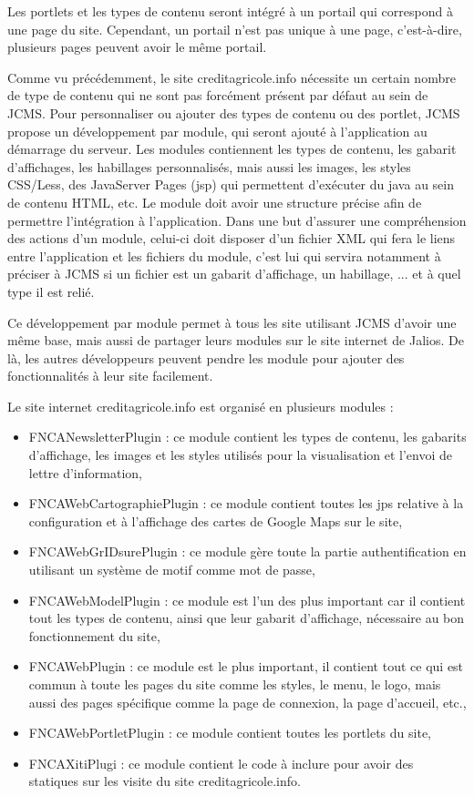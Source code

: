 \documentclass[12pt,a4paper]{article}
\begin{document}
Les portlets et les types de contenu seront intégré à un portail qui correspond à une page du site. Cependant, un portail n'est pas unique à une page, c'est-à-dire, plusieurs pages peuvent avoir le même portail.\par
\medskip
Comme vu précédemment, le site creditagricole.info nécessite un certain nombre de type de contenu qui ne sont pas forcément présent par défaut au sein de JCMS. Pour personnaliser ou ajouter des types de contenu ou des portlet, JCMS propose un développement par module, qui seront ajouté à l'application au démarrage du serveur. Les modules contiennent les types de contenu, les gabarit d'affichages, les habillages personnalisés, mais aussi les images, les styles CSS/Less, des JavaServer Pages (jsp) qui permettent d'exécuter du java au sein de contenu HTML, etc. Le module doit avoir une structure précise afin de permettre l'intégration à l'application. Dans une but d'assurer une compréhension des actions d'un module, celui-ci doit disposer d'un fichier XML qui fera le liens entre l'application et les fichiers du module, c'est lui qui servira notamment à préciser à JCMS si un fichier est un gabarit d'affichage, un habillage, ... et à quel type il est relié.\par 
Ce développement par module permet à tous les site utilisant JCMS d'avoir une même base, mais aussi de partager leurs modules sur le site internet de Jalios. De là, les autres développeurs peuvent pendre les module pour ajouter des fonctionnalités à leur site facilement.\par 
Le site internet creditagricole.info est organisé en plusieurs modules :
\begin{itemize}
\item FNCANewsletterPlugin : ce module contient les types de contenu, les gabarits d'affichage, les images et les styles utilisés pour la visualisation et l'envoi de lettre d'information,
\item FNCAWebCartographiePlugin : ce module contient toutes les jps relative à la configuration et à l'affichage des cartes de Google Maps sur le site,
\item FNCAWebGrIDsurePlugin : ce module gère toute la partie authentification en utilisant un système de motif comme mot de passe,
\item FNCAWebModelPlugin : ce module est l'un des plus important car il contient tout les types de contenu, ainsi que leur gabarit d'affichage, nécessaire au bon fonctionnement du site,
\item FNCAWebPlugin : ce module est le plus important, il contient tout ce qui est commun à toute les pages du site comme les styles, le menu, le logo, mais aussi des pages spécifique comme la page de connexion, la page d'accueil, etc.,
\item FNCAWebPortletPlugin : ce module contient toutes les portlets du site,
\item FNCAXitiPlugi : ce module contient le code à inclure pour avoir des statiques sur les visite du site creditagricole.info.
\end{itemize}\par
\end{document}
